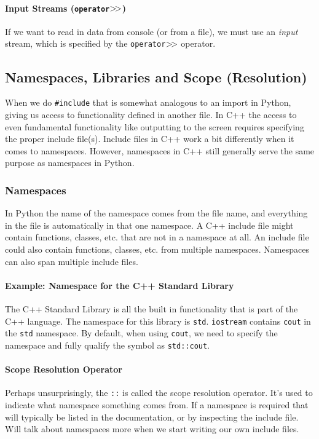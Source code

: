 \documentclass[12pt,letterpaper,twoside]{article}
\begin{document}
\paragraph{Input Streams (\texttt{operator$>\hspace{-2pt}>$})} If we want to read in data
from console (or from a file), we must use an \emph{input} stream,
which is specified by the \texttt{operator$>\hspace{-2pt}>$} operator.

\subsection{Namespaces, Libraries and Scope (Resolution)}
When we do \texttt{\#include}
that is somewhat analogous to an import
in Python, giving us access to functionality defined in another file.
In C++ the access to even fundamental functionality like outputting to
the screen requires specifying the proper include file(s).
Include files in C++ work a bit differently when it comes to
namespaces.
However, namespaces in C++ still generally serve the same purpose as
namespaces in Python.

\vspace{-2ex}
\subsubsection{Namespaces}
In Python the name of the namespace comes from the file name, and
everything in the file is automatically in that one namespace.
A C++ include file might contain functions, classes, etc. that are not
in a namespace at all.
An include file could also contain functions, classes, etc. from
multiple namespaces.
Namespaces can also span multiple include files.

\paragraph{Example: Namespace for the C++ Standard Library}
The C++ Standard Library is all the built in functionality that is
part of the C++ language.
The namespace for this library is \texttt{std}.
\texttt{iostream} contains \texttt{cout} in the \texttt{std} namespace.
By default, when using \texttt{cout}, we need to specify the namespace
and fully qualify the symbol as \texttt{std::cout}.

\paragraph{Scope Resolution Operator}
Perhaps unsurprisingly, the \texttt{::} is called the scope resolution
operator. It's used to indicate what namespace something comes from.
If a namespace is required that will typically be listed in the
documentation, or by inspecting the include file.
Will talk about namespaces more when we start writing our own include
files.
\end{document}
